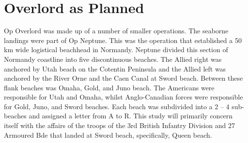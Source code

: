 \documentclass[noraggedright]{turabian-researchpaper}
\begin{document}
\section{Overlord as Planned} %






Op Overlord was made up of a number of smaller operations.  The seaborne
landings were part of Op Neptune.  This was the operation that established a
50 km wide logistical beachhead in Normandy.  Neptune divided this section of
Normandy coastline into five discontinuous beaches.  The Allied right was 
anchored by Utah beach on the Cotentin Peninsula and the Allied left was 
anchored by the River Orne and the Caen Canal at Sword beach.  Between
these flank beaches was Omaha, Gold, and Juno beach.  The Americans were 
responsible for Utah and Omaha, whilst Anglo-Canadian forces were responsible
for Gold, Juno, and Sword beaches.  Each beach was subdivided into a 2 -- 4
sub-beaches and assigned a letter from A to R.  This study will primarily 
concern itself with the affairs of the troops of the 3rd British Infantry 
Division and 27 Armoured Bde that landed at Sword beach, specifically, Queen 
beach.  
\end{document}
